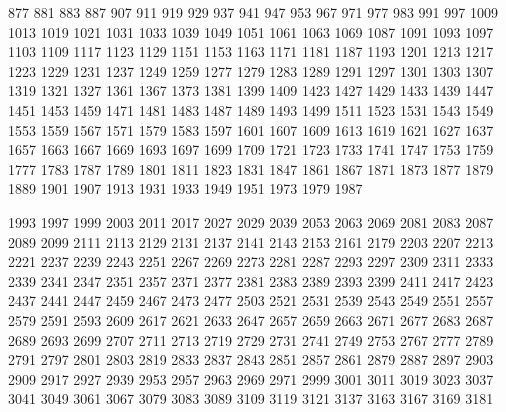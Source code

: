     \vfill
    
    877
    881
    883
    887
    907
    911
    919
    929
    937
    941
    947
    953
    967
    971
    977
    983
    991
    997
    1009
    1013
    1019
    1021
    1031
    1033
    1039
    1049
    1051
    1061
    1063
    1069
    1087
    1091
    1093
    1097
    1103
    1109
    1117
    1123
    1129
    1151
    1153
    1163
    1171
    1181
    1187
    1193
    1201
    1213
    1217
    1223
    1229
    1231
    1237
    1249
    1259
    1277
    1279
    1283
    1289
    1291
    1297
    1301
    1303
    1307
    1319
    1321
    1327
    1361
    1367
    1373
    1381
    1399
    1409
    1423
    1427
    1429
    1433
    1439
    1447
    1451
    1453
    1459
    1471
    1481
    1483
    1487
    1489
    1493
    1499
    1511
    1523
    1531
    1543
    1549
    1553
    1559
    1567
    1571
    1579
    1583
    1597
    1601
    1607
    1609
    1613
    1619
    1621
    1627
    1637
    1657
    1663
    1667
    1669
    1693
    1697
    1699
    1709
    1721
    1723
    1733
    1741
    1747
    1753
    1759
    1777
    1783
    1787
    1789
    1801
    1811
    1823
    1831
    1847
    1861
    1867
    1871
    1873
    1877
    1879
    1889
    1901
    1907
    1913
    1931
    1933
    1949
    1951
    1973
    1979
    1987
    
    \vfill
    
    1993
    1997
    1999
    2003
    2011
    2017
    2027
    2029
    2039
    2053
    2063
    2069
    2081
    2083
    2087
    2089
    2099
    2111
    2113
    2129
    2131
    2137
    2141
    2143
    2153
    2161
    2179
    2203
    2207
    2213
    2221
    2237
    2239
    2243
    2251
    2267
    2269
    2273
    2281
    2287
    2293
    2297
    2309
    2311
    2333
    2339
    2341
    2347
    2351
    2357
    2371
    2377
    2381
    2383
    2389
    2393
    2399
    2411
    2417
    2423
    2437
    2441
    2447
    2459
    2467
    2473
    2477
    2503
    2521
    2531
    2539
    2543
    2549
    2551
    2557
    2579
    2591
    2593
    2609
    2617
    2621
    2633
    2647
    2657
    2659
    2663
    2671
    2677
    2683
    2687
    2689
    2693
    2699
    2707
    2711
    2713
    2719
    2729
    2731
    2741
    2749
    2753
    2767
    2777
    2789
    2791
    2797
    2801
    2803
    2819
    2833
    2837
    2843
    2851
    2857
    2861
    2879
    2887
    2897
    2903
    2909
    2917
    2927
    2939
    2953
    2957
    2963
    2969
    2971
    2999
    3001
    3011
    3019
    3023
    3037
    3041
    3049
    3061
    3067
    3079
    3083
    3089
    3109
    3119
    3121
    3137
    3163
    3167
    3169
    3181
    
